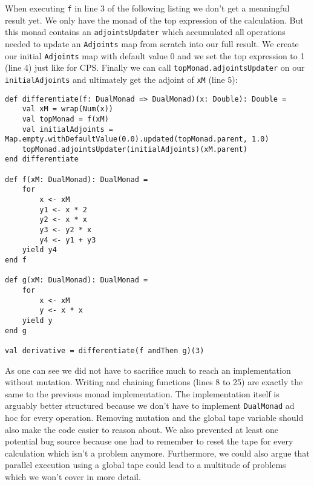When executing \lstinline{f} in line 3 of the following listing we don't get a meaningful result yet. We only have the monad of the top expression of the calculation. But this monad contains an \lstinline{adjointsUpdater} which accumulated all operations needed to update an \lstinline{Adjoints} map from scratch into our full result. We create our initial \lstinline{Adjoints} map with default value 0 and we set the top expression to 1 (line 4) just like for CPS. Finally we can call \lstinline{topMonad.adjointsUpdater} on our \lstinline{initialAdjoints} and ultimately get the adjoint of \lstinline{xM} (line 5):
\begin{lstlisting}
def differentiate(f: DualMonad => DualMonad)(x: Double): Double =
    val xM = wrap(Num(x))
    val topMonad = f(xM)
    val initialAdjoints = Map.empty.withDefaultValue(0.0).updated(topMonad.parent, 1.0)
    topMonad.adjointsUpdater(initialAdjoints)(xM.parent)
end differentiate

def f(xM: DualMonad): DualMonad =
    for
        x <- xM
        y1 <- x * 2
        y2 <- x * x
        y3 <- y2 * x
        y4 <- y1 + y3
    yield y4
end f

def g(xM: DualMonad): DualMonad =
    for
        x <- xM
        y <- x * x
    yield y
end g

val derivative = differentiate(f andThen g)(3)
\end{lstlisting}
As one can see we did not have to sacrifice much to reach an implementation without mutation. Writing and chaining functions (lines 8 to 25) are exactly the same to the previous monad implementation. The implementation itself is arguably better structured because we don't have to implement \lstinline{DualMonad} ad hoc for every operation. Removing mutation and the global tape variable should also make the code easier to reason about. We also prevented at least one potential bug source because one had to remember to reset the tape for every calculation which isn't a problem anymore. Furthermore, we could also argue that parallel execution using a global tape could lead to a multitude of problems which we won't cover in more detail.